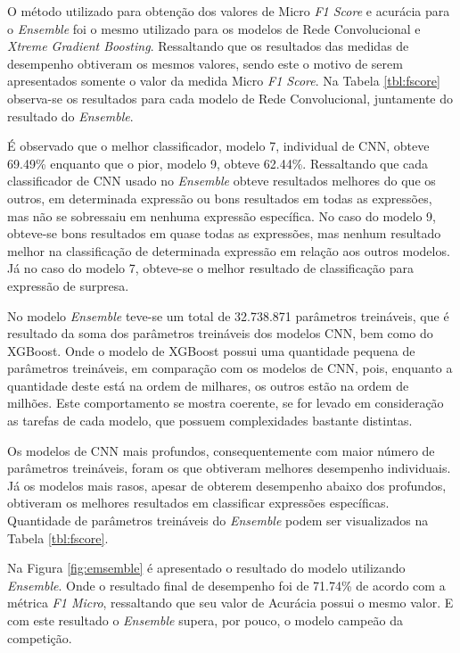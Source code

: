 O método utilizado para obtenção dos valores de Micro \textit{F1 Score} e acurácia para o \textit{Ensemble} foi o mesmo utilizado para os modelos de Rede Convolucional e \textit{Xtreme Gradient Boosting}. Ressaltando que os resultados das medidas de desempenho obtiveram os mesmos valores, sendo este o motivo de serem apresentados somente o valor da medida Micro \textit{F1 Score}. Na Tabela \ref{tbl:fscore} observa-se os resultados para cada modelo de Rede Convolucional, juntamente do resultado do \textit{Ensemble}.



É observado que o melhor classificador, modelo 7, individual de CNN, obteve 69.49\% enquanto que o pior, modelo 9, obteve 62.44\%. Ressaltando que cada classificador de CNN usado no \emph{Ensemble} obteve resultados melhores do que os outros, em determinada expressão ou bons resultados em todas as expressões, mas não se sobressaiu em nenhuma expressão específica. No caso do modelo 9, obteve-se bons resultados em quase todas as expressões, mas nenhum resultado melhor na classificação de determinada expressão em relação aos outros modelos. Já no caso do modelo 7, obteve-se o melhor resultado de classificação para expressão de surpresa.

No modelo \textit{Ensemble} teve-se um total de 32.738.871 parâmetros treináveis, que é resultado da soma dos parâmetros treináveis dos modelos CNN, bem como do XGBoost. Onde o modelo de XGBoost possui uma quantidade pequena de parâmetros treináveis, em comparação com os modelos de CNN, pois, enquanto a quantidade deste está na ordem de milhares, os outros estão na ordem de milhões. Este comportamento se mostra coerente, se for levado em consideração as tarefas de cada modelo, que possuem complexidades bastante distintas.

Os modelos de CNN mais profundos, consequentemente com maior número de parâmetros treináveis, foram os que obtiveram melhores desempenho individuais.   Já os modelos mais rasos, apesar de obterem desempenho abaixo dos profundos, obtiveram os melhores resultados em classificar expressões específicas. Quantidade de parâmetros treináveis do \textit{Ensemble} podem ser visualizados na Tabela \ref{tbl:fscore}.

Na Figura \ref{fig:emsemble} é apresentado o resultado do modelo utilizando \emph{Ensemble}. Onde o resultado final de desempenho foi de 71.74\% de acordo com a métrica \emph{F1 Micro}, ressaltando que seu valor de Acurácia possui o mesmo valor. E com este resultado o \emph{Ensemble} supera, por pouco, o modelo campeão da competição.

